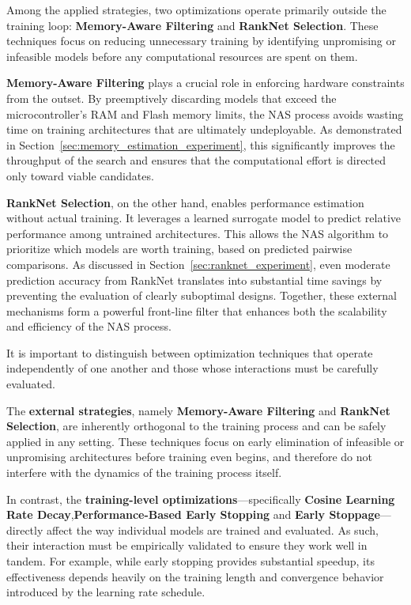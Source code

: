 Among the applied strategies, two optimizations operate primarily outside the training loop: \textbf{Memory-Aware Filtering} and \textbf{RankNet Selection}. These techniques focus on reducing unnecessary training by identifying unpromising or infeasible models before any computational resources are spent on them.

\textbf{Memory-Aware Filtering} plays a crucial role in enforcing hardware constraints from the outset. By preemptively discarding models that exceed the microcontroller's RAM and Flash memory limits, the NAS process avoids wasting time on training architectures that are ultimately undeployable. As demonstrated in Section~\ref{sec:memory_estimation_experiment}, this significantly improves the throughput of the search and ensures that the computational effort is directed only toward viable candidates.

\textbf{RankNet Selection}, on the other hand, enables performance estimation without actual training. It leverages a learned surrogate model to predict relative performance among untrained architectures. This allows the NAS algorithm to prioritize which models are worth training, based on predicted pairwise comparisons. As discussed in Section~\ref{sec:ranknet_experiment}, even moderate prediction accuracy from RankNet translates into substantial time savings by preventing the evaluation of clearly suboptimal designs. Together, these external mechanisms form a powerful front-line filter that enhances both the scalability and efficiency of the NAS process.

It is important to distinguish between optimization techniques that operate independently of one another and those whose interactions must be carefully evaluated. 

The \textbf{external strategies}, namely \textbf{Memory-Aware Filtering} and \textbf{RankNet Selection}, are inherently orthogonal to the training process and can be safely applied in any setting. These techniques focus on early elimination of infeasible or unpromising architectures before training even begins, and therefore do not interfere with the dynamics of the training process itself.

In contrast, the \textbf{training-level optimizations}—specifically \textbf{Cosine Learning Rate Decay},\textbf{Performance-Based Early Stopping} and \textbf{Early Stoppage}—directly affect the way individual models are trained and evaluated. As such, their interaction must be empirically validated to ensure they work well in tandem. For example, while early stopping provides substantial speedup, its effectiveness depends heavily on the training length and convergence behavior introduced by the learning rate schedule.

